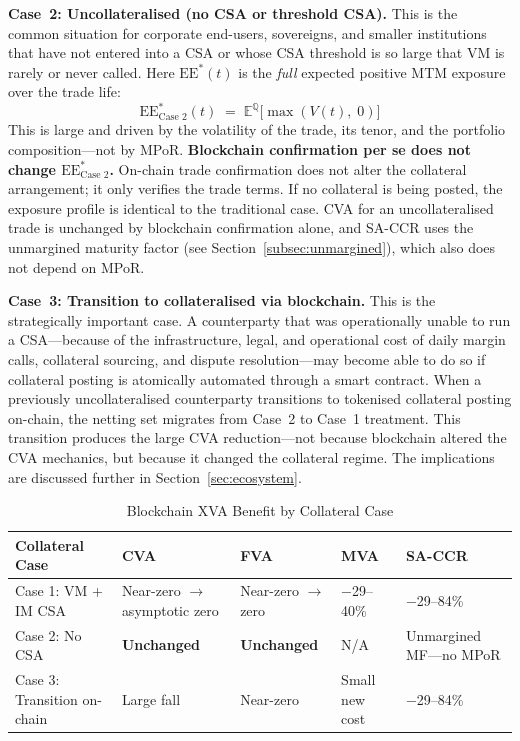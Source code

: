 \documentclass[12pt,letterpaper]{article}
\numberwithin{equation}{section}
\theoremstyle{remark}
\newcommand{\EQ}{\mathbb{E}^{\mathbb{Q}}}          %
\newcommand{\EE}{\mathrm{EE}}
\begin{document}
\textbf{Case~2: Uncollateralised (no CSA or threshold CSA).}
This is the common situation for corporate end-users, sovereigns, and
smaller institutions that have not entered into a CSA or whose CSA threshold
is so large that VM is rarely or never called. Here $\EE^*(t)$ is the
\emph{full} expected positive MTM exposure over the trade life:
\begin{equation}
  \EE^*_{\text{Case 2}}(t) \;=\;
  \EQ\!\bigl[\max(V(t),\; 0)\bigr]
  \label{eq:ee_case2}
\end{equation}
This is large and driven by the volatility of the trade, its tenor, and the
portfolio composition---not by MPoR. \textbf{Blockchain confirmation per se
does not change $\EE^*_{\text{Case 2}}$.} On-chain trade confirmation does
not alter the collateral arrangement; it only verifies the trade terms. If
no collateral is being posted, the exposure profile is identical to the
traditional case. CVA for an uncollateralised trade is unchanged by
blockchain confirmation alone, and SA-CCR uses the unmargined maturity
factor (see Section~\ref{subsec:unmargined}), which also does not depend
on MPoR.

\textbf{Case~3: Transition to collateralised via blockchain.}
This is the strategically important case. A counterparty that was
operationally unable to run a CSA---because of the infrastructure, legal,
and operational cost of daily margin calls, collateral sourcing, and dispute
resolution---may become able to do so if collateral posting is atomically
automated through a smart contract. When a previously uncollateralised
counterparty transitions to tokenised collateral posting on-chain, the
netting set migrates from Case~2 to Case~1 treatment. This transition
produces the large CVA reduction---not because blockchain altered the CVA
mechanics, but because it changed the collateral regime. The implications
are discussed further in Section~\ref{sec:ecosystem}.

\begin{table}[ht]
\centering
\caption{Blockchain XVA Benefit by Collateral Case}
\label{tab:cases}
\begin{tabular}{>{\raggedright}p{3.5cm}
                >{\centering}p{2.0cm}
                >{\centering}p{2.0cm}
                >{\centering}p{2.0cm}
                >{\centering\arraybackslash}p{2.0cm}}
\toprule
\textbf{Collateral Case} & \textbf{CVA} & \textbf{FVA} &
\textbf{MVA} & \textbf{SA-CCR}\\
\midrule
Case 1: VM + IM CSA &
  Near-zero $\to$ asymptotic zero &
  Near-zero $\to$ zero &
  \textcolor{posgreen}{$-$29--40\%} &
  \textcolor{posgreen}{$-$29--84\%}\\[4pt]
Case 2: No CSA &
  \textbf{Unchanged} &
  \textbf{Unchanged} &
  N/A &
  Unmargined MF---no MPoR\\[4pt]
Case 3: Transition on-chain &
  \textcolor{posgreen}{Large fall} &
  \textcolor{posgreen}{Near-zero} &
  \textcolor{posgreen}{Small new cost} &
  \textcolor{posgreen}{$-$29--84\%}\\
\bottomrule
\end{tabular}
\end{table}
\end{document}
